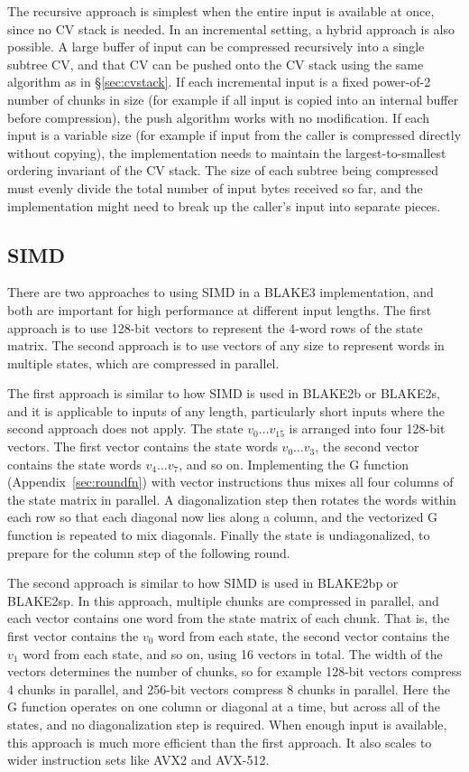 \documentclass[12pt,notitlepage,a4paper]{article}
\begin{document}
The recursive approach is simplest when the entire input is available at once,
since no CV stack is needed. In an incremental setting, a hybrid approach is
also possible. A large buffer of input can be compressed recursively into a
single subtree CV, and that CV can be pushed onto the CV stack using the same
algorithm as in \S\ref{sec:cvstack}. If each incremental input is a fixed
power-of-2 number of chunks in size (for example if all input is copied into an
internal buffer before compression), the push algorithm works with no
modification. If each input is a variable size (for example if input from the
caller is compressed directly without copying), the implementation needs to
maintain the largest-to-smallest ordering invariant of the CV stack. The size
of each subtree being compressed must evenly divide the total number of input
bytes received so far, and the implementation might need to break up the
caller's input into separate pieces.

\subsection{SIMD}\label{sec:simd}

There are two approaches to using SIMD in a BLAKE3 implementation, and both are
important for high performance at different input lengths. The first approach
is to use 128-bit vectors to represent the 4-word rows of the state matrix. The
second approach is to use vectors of any size to represent words in multiple
states, which are compressed in parallel.

The first approach is similar to how SIMD is used in BLAKE2b or BLAKE2s, and it
is applicable to inputs of any length, particularly short inputs where the
second approach does not apply. The state $v_0 \ldots v_{15}$ is arranged into
four 128-bit vectors. The first vector contains the state words $v_0 \ldots
v_3$, the second vector contains the state words $v_4 \ldots v_7$, and so on.
Implementing the G function (Appendix~\ref{sec:roundfn}) with vector
instructions thus mixes all four columns of the state matrix in parallel. A
diagonalization step then rotates the words within each row so that each
diagonal now lies along a column, and the vectorized G function is repeated to
mix diagonals. Finally the state is undiagonalized, to prepare for the column
step of the following round.

The second approach is similar to how SIMD is used in BLAKE2bp or BLAKE2sp. In
this approach, multiple chunks are compressed in parallel, and each vector
contains one word from the state matrix of each chunk. That is, the first
vector contains the $v_0$ word from each state, the second vector contains the
$v_1$ word from each state, and so on, using 16 vectors in total. The width of
the vectors determines the number of chunks, so for example 128-bit vectors
compress 4 chunks in parallel, and 256-bit vectors compress 8 chunks in
parallel. Here the G function operates on one column or diagonal at a time, but
across all of the states, and no diagonalization step is required. When enough
input is available, this approach is much more efficient than the first
approach. It also scales to wider instruction sets like AVX2 and AVX-512.
\end{document}
